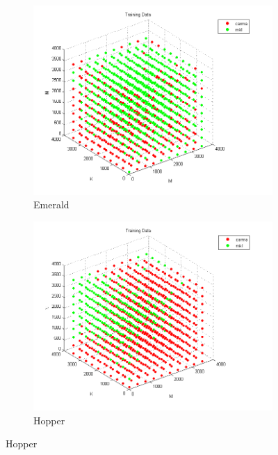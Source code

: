 \begin{figure}[t]
    \centering
        \begin{subfigure}[t]{0.33\textwidth}
            \includegraphics[width=\textwidth]{figures/emerald_train.png}
            \caption{Emerald}
            \label{f:train_emerald}
            \end{subfigure}
        \begin{subfigure}[t]{0.33\textwidth}
            \includegraphics[width=\textwidth]{figures/hopper_train.png}
            \caption{Hopper}
            \label{f:train_hopper}
        \end{subfigure}

\end{figure}

